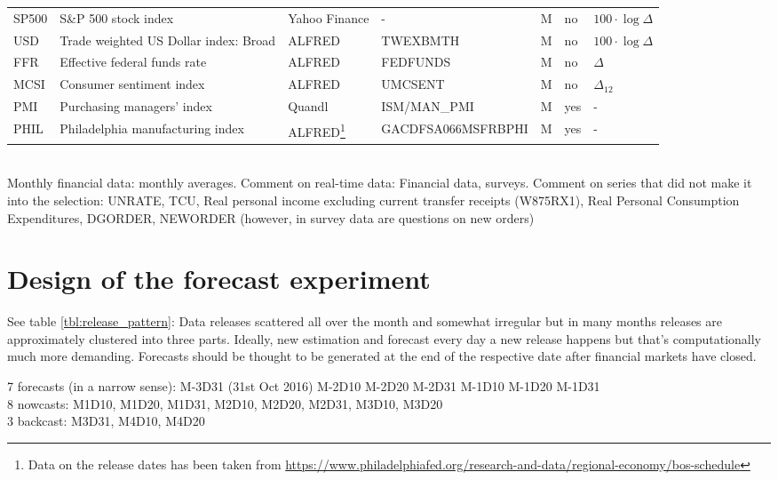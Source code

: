 \begin{sidewaystable}[!htb]
\begin{tabular}{|l|l|l|l|l|l|l|}
		SP500  & S\&P 500 stock index                  & Yahoo Finance & - & M          & no & $100\cdot\log \Delta$ \\
		USD    & Trade weighted US Dollar index: Broad & ALFRED & TWEXBMTH & M          & no & $100\cdot\log \Delta$  \\
		FFR    & Effective federal funds rate          & ALFRED & FEDFUNDS & M          & no & $\Delta$ \\
		MCSI   & Consumer sentiment index              & ALFRED & UMCSENT & M & no  & $\Delta_{12}$    \\ 
		PMI    & Purchasing managers' index            & Quandl & ISM/MAN\_PMI & M      & yes & -    \\ 
		PHIL   & Philadelphia manufacturing index      & ALFRED\footnote{
			Data on the release dates has been taken from \url{https://www.philadelphiafed.org/research-and-data/regional-economy/bos-schedule}
		} & GACDFSA066MSFRBPHI & M & yes & - \\
		\hline
	\end{tabular}
	\vspace{0.3cm}\\
	Monthly financial data: monthly averages. Comment on real-time data: Financial data, surveys. Comment on series that did not make it into the selection: UNRATE, TCU, Real personal income excluding current transfer receipts (W875RX1), Real Personal Consumption Expenditures, DGORDER, NEWORDER (however, in survey data are questions on new orders)
\end{sidewaystable}

\section{Design of the forecast experiment}

See table \ref{tbl:release_pattern}: Data releases scattered all over the month and somewhat irregular but in many months releases are approximately clustered into three parts. Ideally, new estimation and forecast every day a new release happens but that's computationally much more demanding. Forecasts should be thought to be generated at the end of the respective date after financial markets have closed.


7 forecasts (in a narrow sense): M-3D31 (31st Oct 2016) M-2D10 M-2D20 M-2D31 M-1D10 M-1D20 M-1D31\\
8 nowcasts:    M1D10, M1D20, M1D31, M2D10, M2D20, M2D31, M3D10, M3D20 \\
3 backcast:    M3D31, M4D10, M4D20

